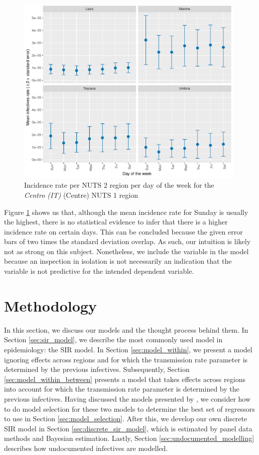 \documentclass[12pt]{article}
\begin{document}
	\begin{figure}[ht]
	    \centering
	    \includegraphics[width=0.98\textwidth]{output/infective_rates_weekday_Centro (IT).pdf}
	    \caption{Incidence rate per NUTS 2 region per day of the week for the \textit{Centro (IT)} (Centre) NUTS 1 region}
	    \label{fig:incidence_Centro_weekday}
	\end{figure}
	
	Figure \ref{fig:incidence_Centro_weekday} shows us that, although the mean incidence rate for Sunday is usually the highest, there is no statistical evidence to infer that there is a higher incidence rate on certain days. This can be concluded because the given error bars of two times the standard deviation overlap. As such, our intuition is likely not as strong on this subject. Nonetheless, we include the variable in the model because an inspection in isolation is not necessarily an indication that the variable is not predictive for the intended dependent variable.
	
	\newpage
	\section{Methodology} \label{sec:methodology}
	In this section, we discuss our models and the thought process behind them. In Section \ref{sec:sir_model}, we describe the most commonly used model in epidemiology: the SIR model. In Section \ref{sec:model_within}, we present a model ignoring effects across regions and for which the transmission rate parameter is determined by the previous infectives. Subsequently, Section \ref{sec:model_within_between} presents a model that takes effects across regions into account for which the transmission rate parameter is determined by the previous infectives. Having discussed the models presented by \textcite{adda2016economic}, we consider how to do model selection for these two models to determine the best set of regressors to use in Section \ref{sec:model_selection}. After this, we develop our own discrete SIR model in Section \ref{sec:discrete_sir_model}, which is estimated by panel data methods and Bayesian estimation. Lastly, Section \ref{sec:undocumented_modelling} describes how undocumented infectives are modelled.
	
\end{document}
